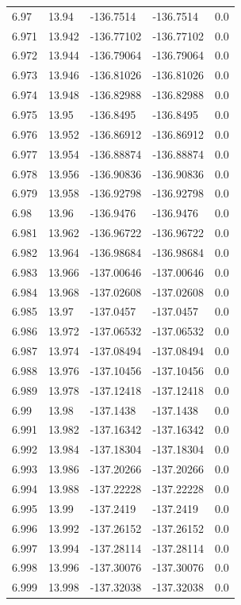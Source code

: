\begin{tabular}{lllll}
6.97 & 13.94 & -136.7514 & -136.7514 & 0.0 \\
6.971 & 13.942 & -136.77102 & -136.77102 & 0.0 \\
6.972 & 13.944 & -136.79064 & -136.79064 & 0.0 \\
6.973 & 13.946 & -136.81026 & -136.81026 & 0.0 \\
6.974 & 13.948 & -136.82988 & -136.82988 & 0.0 \\
6.975 & 13.95 & -136.8495 & -136.8495 & 0.0 \\
6.976 & 13.952 & -136.86912 & -136.86912 & 0.0 \\
6.977 & 13.954 & -136.88874 & -136.88874 & 0.0 \\
6.978 & 13.956 & -136.90836 & -136.90836 & 0.0 \\
6.979 & 13.958 & -136.92798 & -136.92798 & 0.0 \\
6.98 & 13.96 & -136.9476 & -136.9476 & 0.0 \\
6.981 & 13.962 & -136.96722 & -136.96722 & 0.0 \\
6.982 & 13.964 & -136.98684 & -136.98684 & 0.0 \\
6.983 & 13.966 & -137.00646 & -137.00646 & 0.0 \\
6.984 & 13.968 & -137.02608 & -137.02608 & 0.0 \\
6.985 & 13.97 & -137.0457 & -137.0457 & 0.0 \\
6.986 & 13.972 & -137.06532 & -137.06532 & 0.0 \\
6.987 & 13.974 & -137.08494 & -137.08494 & 0.0 \\
6.988 & 13.976 & -137.10456 & -137.10456 & 0.0 \\
6.989 & 13.978 & -137.12418 & -137.12418 & 0.0 \\
6.99 & 13.98 & -137.1438 & -137.1438 & 0.0 \\
6.991 & 13.982 & -137.16342 & -137.16342 & 0.0 \\
6.992 & 13.984 & -137.18304 & -137.18304 & 0.0 \\
6.993 & 13.986 & -137.20266 & -137.20266 & 0.0 \\
6.994 & 13.988 & -137.22228 & -137.22228 & 0.0 \\
6.995 & 13.99 & -137.2419 & -137.2419 & 0.0 \\
6.996 & 13.992 & -137.26152 & -137.26152 & 0.0 \\
6.997 & 13.994 & -137.28114 & -137.28114 & 0.0 \\
6.998 & 13.996 & -137.30076 & -137.30076 & 0.0 \\
6.999 & 13.998 & -137.32038 & -137.32038 & 0.0 \\

\end{tabular}
